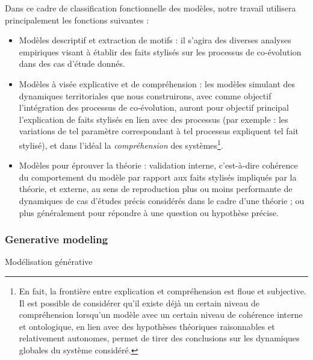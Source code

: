 Dans ce cadre de classification fonctionnelle des modèles, notre travail utilisera principalement les fonctions suivantes :

\begin{itemize}
	\item Modèles descriptif et extraction de motifs : il s'agira des diverses analyses empiriques visant à établir des faits stylisés sur les processus de co-évolution dans des cas d'étude donnés.
	\item Modèles à visée explicative et de compréhension : les modèles simulant des dynamiques territoriales que nous construirons, avec comme objectif l'intégration des processus de co-évolution, auront pour objectif principal l'explication de faits stylisés en lien avec des processus (par exemple : les variations de tel paramètre correspondant à tel processus expliquent tel fait stylisé), et dans l'idéal la \emph{compréhension} des systèmes\footnote{En fait, la frontière entre explication et compréhension est floue et subjective. Il est possible de considérer qu'il existe déjà un certain niveau de compréhension lorsqu'un modèle avec un certain niveau de cohérence interne et ontologique, en lien avec des hypothèses théoriques raisonnables et relativement autonomes, permet de tirer des conclusions sur les dynamiques globales du système considéré.}.
	\item Modèles pour éprouver la théorie : validation interne, c'est-à-dire cohérence du comportement du modèle par rapport aux faits stylisés impliqués par la théorie, et externe, au sens de reproduction plus ou moins performante de dynamiques de cas d'études précis considérés dans le cadre d'une théorie ; ou plus généralement pour répondre à une question ou hypothèse précise.
\end{itemize}

\subsubsection{Generative modeling}{Modélisation générative}

